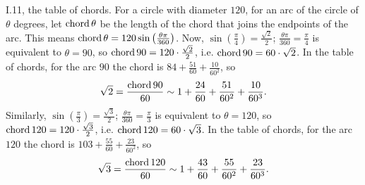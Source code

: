 \documentclass{amsart}
\newcommand{\chord}{\ensuremath\mathrm{chord}\,}
\theoremstyle{definition}
\begin{document}
I.11, the table of chords. For a circle with diameter $120$, for
an arc of the circle of $\theta$ degrees, let $\chord \theta$ be the length of the chord 
that joins the endpoints of the arc. This means
$\chord \theta = 120 \sin\left(\frac{\theta \pi}{360} \right)$. 
Now, $\sin\left( \frac{\pi}{4} \right) = \frac{\sqrt{2}}{2}$;
$\frac{\theta \pi}{360} = \frac{\pi}{4}$ is equivalent to
$\theta=90$, so
$\chord 90 = 120 \cdot \frac{\sqrt{2}}{2}$, i.e.
$\chord 90 = 60 \cdot \sqrt{2}$. In the table of chords, for
the arc $90$ the chord is $84+\frac{51}{60}+\frac{10}{60^2}$,
so
\[
\sqrt{2} = \frac{\chord 90}{60} \sim 1+\frac{24}{60}+\frac{51}{60^2}+\frac{10}{60^3}.
\]
Similarly, $\sin\left( \frac{\pi}{3} \right) = \frac{\sqrt{3}}{2}$;
$\frac{\theta \pi}{360} = \frac{\pi}{3}$ is equivalent to $\theta = 120$, so
$\chord 120 = 120 \cdot \frac{\sqrt{3}}{2}$, i.e. $\chord 120 = 60 \cdot \sqrt{3}$. 
In the table of chords, for the arc $120$ the chord is $103+\frac{55}{60}+\frac{23}{60^2}$, so
\[
\sqrt{3} = \frac{\chord 120}{60} \sim 1+\frac{43}{60}+\frac{55}{60^2}+\frac{23}{60^3}.
\]
\end{document}
